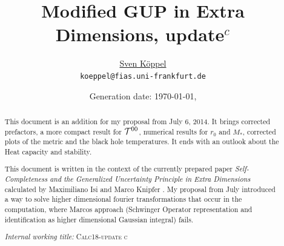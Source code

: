 \documentclass[10pt,a4paper]{article}
\title{Modified GUP in Extra Dimensions, update$^c$}
\author{\href{https://itp.uni-frankfurt.de/~koeppel}{Sven Köppel} \\
\texttt{koeppel@fias.uni-frankfurt.de}}
\date{Generation date: \today, \currenttime}
\begin{document}
\maketitle

\renewcommand{\d}{\mathrm{d}}
\newcommand{\dd}[2]{\frac{\mathrm{d} #1}{\mathrm{d} #2}}
\newcommand{\pp}[2]{\frac{\partial #1}{\partial #2}}
\newcommand{\dann}{$\rightarrow~$}
\newcommand{\CA}{ {\cal A}}
\newcommand{\C}[1]{ {\cal #1} }
\newcommand{\mn}{_{\mu\nu}}
\newcommand{\bv}[1]{ \mathbf{ #1 } } %

\newcommand*{\mathcolor}{}
\def\mathcolor#1#{\mathcoloraux{#1}}
\newcommand*{\mathcoloraux}[3]{%
  \protect\leavevmode
  \begingroup
    \color#1{#2}#3%
  \endgroup
}
\newcommand{\redmin}{\mathcolor{red}{-}}
\newcommand{\redplus}{\mathcolor{red}{+}}
\newcommand{\pn}{\mathcolor{OliveGreen}{+ n}}
\newcommand{\n}{ {\mathcolor{OliveGreen}{n}} }

\begin{abstract}
This document is an addition for my proposal from July 6, 2014. It brings
corrected prefactors, a more compact result for $\C T^{00}$, numerical
results for $r_0$ and $M_*$, corrected plots of the metric and the black hole
temperatures. It ends with an outlook about the Heat capacity and stability.

This document is written in the context of the currently prepared paper
\textit{Self-Completeness and the Generalized
Uncertainty Principle in Extra Dimensions} calculated by
Maximiliano Isi and Marco Knipfer \cite{work}. My proposal from July
introduced a way to solve higher dimensional fourier transformations
that occur in the computation, where Marcos approach (Schwinger Operator representation
and identification as higher dimensional Gaussian integral) fails.

\hfill\textit{Internal working title:} \textsc{Calc18-update c}
\end{abstract}


\tableofcontents


\vfill
\end{document}
